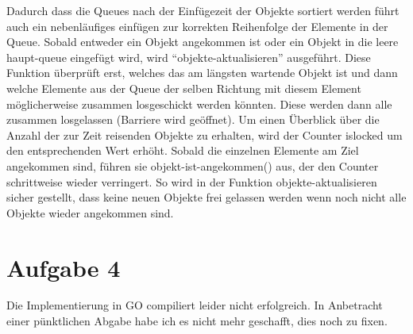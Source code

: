 \documentclass[11pt,a4paper,DIV=10,]{scrartcl}
\begin{document}
Dadurch dass die Queues nach der Einfügezeit der Objekte sortiert werden führt auch ein nebenläufiges einfügen zur korrekten Reihenfolge der Elemente in der Queue. Sobald entweder ein Objekt angekommen ist oder ein Objekt in die leere haupt-queue eingefügt wird, wird ``objekte-aktualisieren'' ausgeführt.
Diese Funktion überprüft erst, welches das am längsten wartende Objekt ist und dann welche Elemente aus der Queue der selben Richtung mit diesem Element möglicherweise zusammen losgeschickt werden könnten. Diese werden dann alle zusammen losgelassen (Barriere wird geöffnet). Um einen Überblick über die 
Anzahl der zur Zeit reisenden Objekte zu erhalten, wird der Counter islocked um den entsprechenden Wert erhöht. Sobald die einzelnen Elemente am Ziel angekommen sind, führen sie objekt-ist-angekommen() aus, der den Counter schrittweise wieder verringert. So wird in der Funktion objekte-aktualisieren sicher gestellt, dass keine neuen Objekte frei gelassen werden wenn noch nicht alle Objekte wieder angekommen sind. 

\section*{Aufgabe 4}
Die Implementierung in GO compiliert leider nicht erfolgreich. In Anbetracht einer pünktlichen Abgabe habe ich es nicht mehr geschafft, dies noch zu fixen. 




\end{document}

